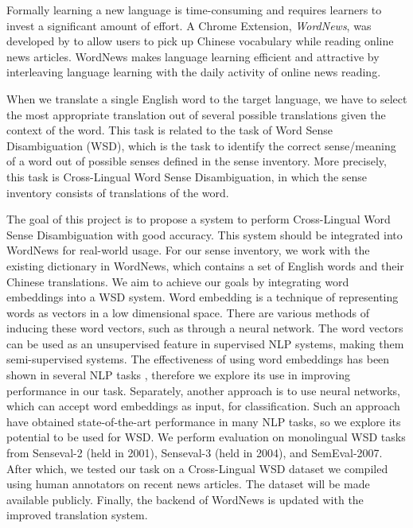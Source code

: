 \documentclass[11pt]{article}
\begin{document}
Formally learning a new language is time-consuming and requires learners to invest a significant
amount of effort. A Chrome Extension, {\it WordNews}, was developed by \cite{tao2014} to allow users to pick up Chinese vocabulary while reading online news articles. WordNews makes language learning efficient and attractive by interleaving language
learning with the daily activity of online news reading. 

	
When we translate a single English word to the target language, we have to select the most appropriate translation out of several possible translations given the context of the word. This task is related to the task of Word Sense Disambiguation (WSD), which is the task to identify the correct sense/meaning of a word out of possible senses defined in the sense inventory. More precisely, this task is Cross-Lingual Word Sense Disambiguation, in which the sense inventory consists of translations of the word.


The goal of this project is to propose a system to perform Cross-Lingual Word Sense Disambiguation with good accuracy. This system should be integrated into WordNews for real-world usage. 
For our sense inventory, we work with the existing dictionary in WordNews, which contains a set of English words and their Chinese translations. We aim to achieve our goals by integrating word embeddings into a WSD system. 
Word embedding is a technique of representing words as vectors in a low dimensional space. There are various methods of inducing these word vectors, such as through a neural network. The word vectors can be used as an unsupervised feature in supervised NLP systems, making them semi-supervised systems. The effectiveness of using word embeddings has been shown in several NLP tasks \cite{Turian10wordrepresentations}, therefore we explore its use in improving performance in our task. Separately, another approach is to use neural networks, which can accept word embeddings as input, for classification. Such an approach have obtained state-of-the-art performance in many NLP tasks, so we explore its potential to be used for WSD. We perform evaluation on monolingual WSD tasks from Senseval-2 (held in 2001), Senseval-3 (held in 2004), and SemEval-2007. After which, we tested our task on a Cross-Lingual WSD dataset we compiled using human annotators on recent news articles. The dataset will be made available publicly.  Finally, the backend of WordNews is updated with the improved translation system. 
\end{document}
